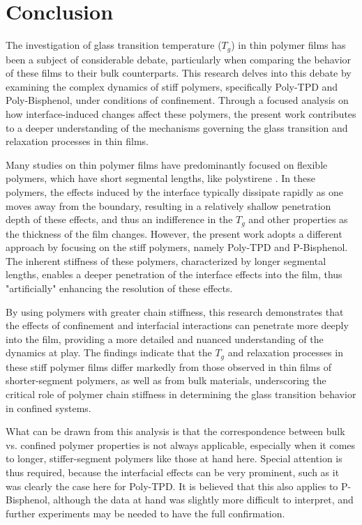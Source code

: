 \clearpage


\chapter{Conclusion}

The investigation of glass transition temperature (\(T_g\)) in thin polymer films has been a subject of considerable debate, particularly when comparing the behavior of these films to their bulk counterparts. This research delves into this debate by examining the complex dynamics of stiff polymers, specifically Poly-TPD and Poly-Bisphenol, under conditions of confinement. Through a focused analysis on how interface-induced changes affect these polymers, the present work contributes to a deeper understanding of the mechanisms governing the glass transition and relaxation processes in thin films.


Many studies on thin polymer films have predominantly focused on flexible polymers, which have short segmental lengths, like polystirene \cite{winkler2021}. In these polymers, the effects induced by the interface typically dissipate rapidly as one moves away from the boundary, resulting in a relatively shallow penetration depth of these effects, and thus an indifference in the $T_g$ and other properties as the thickness of the film changes. However, the present work adopts a different approach by focusing on the stiff polymers, namely Poly-TPD and P-Bisphenol. The inherent stiffness of these polymers, characterized by longer segmental lengths, enables a deeper penetration of the interface effects into the film, thus "artificially" enhancing the resolution of these effects.

By using polymers with greater chain stiffness, this research demonstrates that the effects of confinement and interfacial interactions can penetrate more deeply into the film, providing a more detailed and nuanced understanding of the dynamics at play. The findings indicate that the \(T_g\) and relaxation processes in these stiff polymer films differ markedly from those observed in thin films of shorter-segment polymers, as well as from bulk materials, underscoring the critical role of polymer chain stiffness in determining the glass transition behavior in confined systems.

What can be drawn from this analysis is that the correspondence between bulk vs. confined polymer properties is not always applicable, especially when it comes to longer, stiffer-segment polymers like those at hand here. Special attention is thus required, because the interfacial effects can be very prominent, such as it was clearly the case here for Poly-TPD. It is believed that this also applies to P-Bisphenol, although the data at hand was slightly more difficult to interpret, and further experiments may be needed to have the full confirmation.

